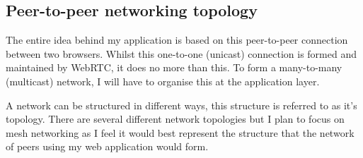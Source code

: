 \documentclass[]{report}
\begin{document}
		
		\subsection*{Peer-to-peer networking topology}
			The entire idea behind my application is based on this peer-to-peer connection between two browsers. Whilst this one-to-one (unicast) connection is formed and maintained by WebRTC, it does no more than this. To form a many-to-many (multicast) network, I will have to organise this at the application layer.
		
			A network can be structured in different ways, this structure is referred to as it's topology. There are several different network topologies but I plan to focus on mesh networking as I feel it would best represent the structure that the network of peers using my web application would form. 
		
\end{document}
